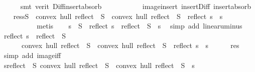 \begin{isabellebody}
\ \ \ \ \isamarkupfalse%
\ {\isacharparenleft}{\kern0pt}smt\ {\isacharparenleft}{\kern0pt}verit{\isacharparenright}{\kern0pt}\ Diff{\isacharunderscore}{\kern0pt}insert{\isacharunderscore}{\kern0pt}absorb\ {}\ {}\ {}\isanewline
\ \ \ \ \ \ \ \ image{\isacharunderscore}{\kern0pt}insert\ insert{\isacharunderscore}{\kern0pt}Diff\ insert{\isacharunderscore}{\kern0pt}absorb{\isacharparenright}{\kern0pt}\isanewline
\ \ \isamarkupfalse%
\ res{\isacharcolon}{\kern0pt}{\isachardoublequoteopen}s{\isasymin}S\ {\isasymlongrightarrow}\ convex\ hull\ reflect\ {\isacharbackquote}{\kern0pt}\ S\ {\isasymnoteq}\ convex\ hull\ {\isacharparenleft}{\kern0pt}reflect\ {\isacharbackquote}{\kern0pt}\ S\ {\isacharminus}{\kern0pt}\ {\isacharbraceleft}{\kern0pt}reflect\ s{\isacharbraceright}{\kern0pt}{\isacharparenright}{\kern0pt}{\isachardoublequoteclose}\ \ s\isanewline
\ \ \ \ \isamarkupfalse%
\ {}\ {}\ {}\ {}\isanewline
\ \ \ \ \isamarkupfalse%
\ metis\isanewline
\ \ \isamarkupfalse%
\ {\isachardoublequoteopen}s\ {\isasymin}\ S\ {\isasymlongrightarrow}\ reflect\ s\ {\isasymin}\ reflect\ {\isacharbackquote}{\kern0pt}\ S{\isachardoublequoteclose}\ \ s\ \isamarkupfalse%
\ {\isacharparenleft}{\kern0pt}simp\ add{\isacharcolon}{\kern0pt}\ linear{\isacharunderscore}{\kern0pt}uminus{\isacharparenright}{\kern0pt}\isanewline
\ \ \isamarkupfalse%
\ {\isachardoublequoteopen}reflect\ s\ {\isasymin}\ reflect\ {\isacharbackquote}{\kern0pt}\ S\ \isanewline
\ \ \ \ \ {\isasymlongrightarrow}\ convex\ hull\ reflect\ {\isacharbackquote}{\kern0pt}\ S\ {\isasymnoteq}\ convex\ hull\ {\isacharparenleft}{\kern0pt}reflect\ {\isacharbackquote}{\kern0pt}\ S\ {\isacharminus}{\kern0pt}\ {\isacharbraceleft}{\kern0pt}reflect\ s{\isacharbraceright}{\kern0pt}{\isacharparenright}{\kern0pt}{\isachardoublequoteclose}\ \ s\isanewline
\ \ \ \ \isamarkupfalse%
\ res\ \isamarkupfalse%
\ {\isacharparenleft}{\kern0pt}simp\ add{\isacharcolon}{\kern0pt}\ image{\isacharunderscore}{\kern0pt}iff{\isacharparenright}{\kern0pt}\isanewline
\ \ \isamarkupfalse%
\ {\isachardoublequoteopen}{\isasymforall}s{\isasymin}reflect\ {\isacharbackquote}{\kern0pt}\ S{\isachardot}{\kern0pt}\ convex\ hull\ reflect\ {\isacharbackquote}{\kern0pt}\ S\ {\isasymnoteq}\ convex\ hull\ {\isacharparenleft}{\kern0pt}reflect\ {\isacharbackquote}{\kern0pt}\ S\ {\isacharminus}{\kern0pt}\ {\isacharbraceleft}{\kern0pt}s{\isacharbraceright}{\kern0pt}{\isacharparenright}{\kern0pt}{\isachardoublequoteclose}\ \isamarkupfalse%

\end{isabellebody}
